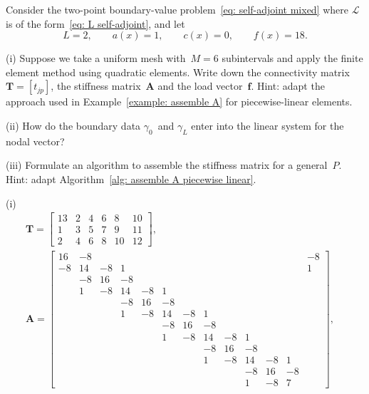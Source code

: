\begin{Exercises}
\exercise\label{ex: assemble quadratic 1d}
Consider the two-point boundary-value problem~\eqref{eq: self-adjoint mixed} 
where $\mathcal{L}$ is of the form~\eqref{eq: L self-adjoint}, and let
\[
L=2,\qquad a(x)=1,\qquad c(x)=0,\qquad f(x)=18.
\]
\begin{description}
\item{(i)} Suppose we take a uniform mesh with~$M=6$ subintervals and apply the 
finite element method using quadratic elements.  Write down the connectivity 
matrix~$\boldsymbol{T}=[t_{jp}]$, the stiffness matrix~$\boldsymbol{A}$ and 
the load vector~$\boldsymbol{f}$. Hint: adapt the approach used in 
Example~\ref{example: assemble A} for piecewise-linear elements.
\item{(ii)} How do the boundary data $\gamma_0$~and $\gamma_L$ enter into the 
linear system for the nodal vector?
\item{(iii)} Formulate an algorithm to assemble the stiffness matrix for a 
general~$P$.  Hint: adapt Algorithm~\ref{alg: assemble A piecewise linear}.
\end{description}
\begin{ans}
(i) 
\begin{gather*}
\boldsymbol{T}=\begin{bmatrix}
13& 2& 4& 6& 8&10\\
 1& 3& 5& 7& 9&11\\
 2& 4& 6& 8&10&12
\end{bmatrix},\\
\boldsymbol{A}=\left[\begin{array}{cccccccccccc|c}
16&-8&  &  &  &  &  &  &  &  &  &  &-8\\
-8&14&-8& 1&  &  &  &  &  &  &  &  & 1\\
  &-8&16&-8&  &  &  &  &  &  &  &  &  \\
  & 1&-8&14&-8& 1&  &  &  &  &  &  &  \\
  &  &  &-8&16&-8&  &  &  &  &  &  &\\
  &  &  & 1&-8&14&-8& 1&  &  &  &  &  \\
  &  &  &  &  &-8&16&-8&  &  &  &  &  \\
  &  &  &  &  & 1&-8&14&-8& 1&  &  &  \\
  &  &  &  &  &  &  &-8&16&-8&  &  &  \\
  &  &  &  &  &  &  & 1&-8&14&-8& 1&  \\
  &  &  &  &  &  &  &  &  &-8&16&-8&  \\
  &  &  &  &  &  &  &  &  & 1&-8& 7&
\end{array}\right],\quad

\end{gather*}
\end{ans}
\end{Exercises}
